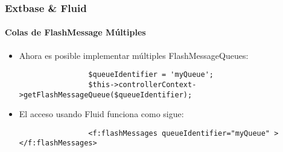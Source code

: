 \begin{frame}[fragile]
	\frametitle{Extbase \& Fluid}
	\framesubtitle{Colas de FlashMessage Múltiples}

	\begin{itemize}

		\item Ahora es posible implementar múltiples FlashMessageQueues:

			\begin{lstlisting}
				$queueIdentifier = 'myQueue';
				$this->controllerContext->getFlashMessageQueue($queueIdentifier);
			\end{lstlisting}

		\item El acceso usando Fluid funciona como sigue:

			\begin{lstlisting}
				<f:flashMessages queueIdentifier="myQueue" ></f:flashMessages>
			\end{lstlisting}

	\end{itemize}

\end{frame}


